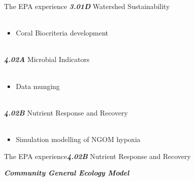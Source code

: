 \documentclass[serif]{beamer}\usepackage[]{graphicx}\usepackage[]{color}
\newcommand{\emtxt}[1]{\textbf{\textit{#1}}}
\begin{document}
\begin{frame}{The EPA experience}{}
\emtxt{3.01D} Watershed Sustainability \\~\\
\begin{itemize}
\item Coral Biocriteria development \\~\\
\end{itemize}
\emtxt{4.02A} Microbial Indicators \\~\\
\begin{itemize}
\item Data munging  \\~\\
\end{itemize}
\emtxt{4.02B} Nutrient Response and Recovery \\~\\
\begin{itemize}
\item Simulation modelling of NGOM hypoxia
\end{itemize}
\end{frame}

\begin{frame}{The EPA experience}{\emtxt{4.02B} Nutrient Response and Recovery}
\centerline{\emtxt{Community General Ecology Model}}
\vspace{0.1in}
\centerline{}
\end{frame}
\end{document}
